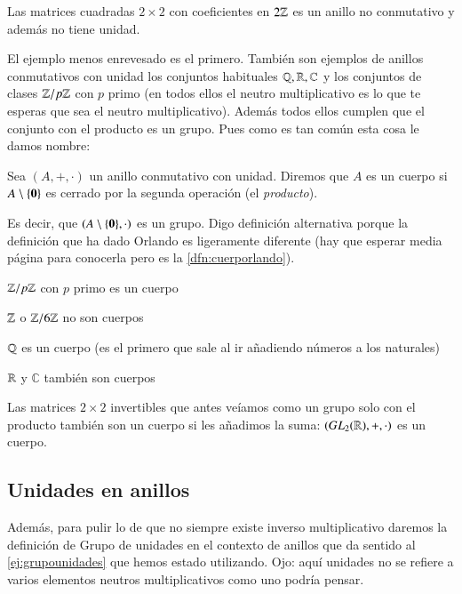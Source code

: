 \begin{ej}
	Las matrices cuadradas $2\times 2$ con coeficientes en $2\mathbb{Z}$ es un anillo no conmutativo y además no tiene unidad.
\end{ej}

El ejemplo menos enrevesado es el primero. También son ejemplos de anillos conmutativos con unidad los conjuntos habituales $\mathbb{Q}, \mathbb{R}, \mathbb{C}$ y los conjuntos de clases $\mathbb{Z}/p\mathbb{Z}$ con $p$ primo (en todos ellos el neutro multiplicativo es lo que te esperas que sea el neutro multiplicativo). Además todos ellos cumplen que el conjunto con el producto es un grupo. Pues como es tan común esta cosa le damos nombre:

\begin{dfn}
	Sea $(A, +, \cdot)$ un anillo conmutativo con unidad. Diremos que $A$ es un cuerpo si $A\setminus \{\mathbf{0}\}$ es cerrado por la segunda operación (el \textit{producto}).
\end{dfn}

Es decir, que $(A\setminus\{\mathbf{0}\}, \cdot)$ es un grupo. Digo definición alternativa porque la definición que ha dado Orlando es ligeramente diferente (hay que esperar media página para conocerla pero es la \autoref{dfn:cuerporlando}).

\begin{ej}
	\item $\mathbb{Z}/p\mathbb{Z}$ con $p$ primo es un cuerpo
	\item $\mathbb{Z}$ o $\mathbb{Z}/6\mathbb{Z}$ no son cuerpos
	\item $\mathbb{Q}$ es un cuerpo (es el primero que sale al ir añadiendo números a los naturales)
	\item $\mathbb{R}$ y $\mathbb{C}$ también son cuerpos
	\item Las matrices $2 \times 2$ invertibles que antes veíamos como un grupo solo con el producto también son un cuerpo si les añadimos la suma: $(GL_2(\mathbb{R}), +, \cdot)$ es un cuerpo.
\end{ej}

\subsection{Unidades en anillos}

Además, para pulir lo de que no siempre existe inverso multiplicativo daremos la definición de Grupo de unidades en el contexto de anillos que da sentido al \autoref{ej:grupounidades} que hemos estado utilizando. Ojo: aquí unidades no se refiere a varios elementos neutros multiplicativos como uno podría pensar.

